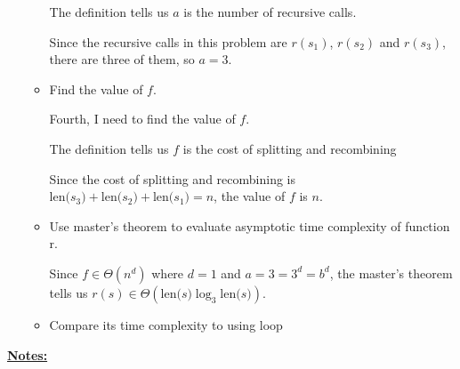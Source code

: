 \documentclass[12pt]{article}
\begin{document}
\begin{itemize}
\begin{mdframed}
\begin{itemize}
        \bigskip

        \begin{mdframed}
        The definition tells us $a$ is the number of recursive calls.

        \bigskip

        Since the recursive calls in this problem are $r(s_1)$, $r(s_2)$ and $r(s_3)$,
        there are three of them, so $a = 3$.
        \end{mdframed}

        \item Find the value of $f$.

        \bigskip

        Fourth, I need to find the value of $f$.

        \bigskip

        \begin{mdframed}
        The definition tells us $f$ is the cost of splitting and recombining

        Since the cost of splitting and recombining is $\text{len($s_3$)} + \text{len($s_2$)} + \text{len($s_1$)} = n$,
        the value of $f$ is $n$.
        \end{mdframed}

        \item Use master's theorem to evaluate asymptotic time complexity of function r.

        \begin{mdframed}
        Since $f \in \Theta(n^d)$ where $d = 1$ and $a = 3 = 3^d = b^d$, the
        master's theorem tells us $r(s) \in \Theta(\text{len($s$)}\log_3 \text{len($s$)})$.
        \end{mdframed}
        \item Compare its time complexity to using loop
    \end{itemize}
    \end{mdframed}

\end{itemize}

\bigskip

\underline{\textbf{Notes:}}

\bigskip
\end{document}

